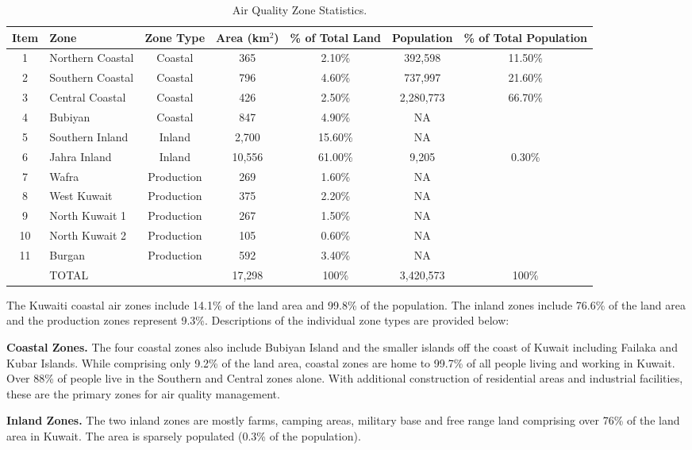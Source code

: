 \begin{table}[!htb]
\centering
\caption{Air Quality Zone Statistics.}
\label{tb:aqzstats}
\begin{tabular}{@{}clccccc@{}}
\toprule
\textbf{Item} & \textbf{Zone} & \textbf{Zone Type} & \textbf{Area (km$^{2}$)} & \textbf{\% of Total Land} & \textbf{Population} & \textbf{\% of Total Population} \\ \midrule
1 & Northern Coastal & Coastal & 365 & 2.10\% & 392,598 & 11.50\% \\
2 & Southern Coastal & Coastal & 796 & 4.60\% & 737,997 & 21.60\% \\
3 & Central Coastal & Coastal & 426 & 2.50\% & 2,280,773 & 66.70\% \\
4 & Bubiyan & Coastal & 847 & 4.90\% & NA &  \\
5 & Southern Inland & Inland & 2,700 & 15.60\% & NA &  \\
6 & Jahra Inland & Inland & 10,556 & 61.00\% & 9,205 & 0.30\% \\
7 & Wafra & Production & 269 & 1.60\% & NA &  \\
8 & West Kuwait & Production & 375 & 2.20\% & NA &  \\
9 & North Kuwait 1 & Production & 267 & 1.50\% & NA &  \\
10 & North Kuwait 2 & Production & 105 & 0.60\% & NA &  \\
11 & Burgan & Production & 592 & 3.40\% & NA &  \\
 & TOTAL &  & 17,298 & 100\% & 3,420,573 & 100\% \\ \bottomrule
\end{tabular}
\end{table}

The Kuwaiti coastal air zones include 14.1\% of the land area and 99.8\% of the population.  The inland zones include 76.6\% of the land area and the production zones represent 9.3\%.  Descriptions of the individual zone types are provided below:

\textbf{Coastal Zones.} The four coastal zones also include Bubiyan Island and the smaller islands off the coast of Kuwait including Failaka and Kubar Islands.  While comprising only 9.2\% of the land area, coastal zones are home to 99.7\% of all people living and working in Kuwait. Over 88\% of people live in the Southern and Central zones alone.  With additional construction of residential areas and industrial facilities, these are the primary zones for air quality management. 

\textbf{Inland Zones.} The two inland zones are mostly farms, camping areas, military base and free range land comprising over 76\% of the land area in Kuwait. The area is sparsely populated (0.3\% of the population).  

